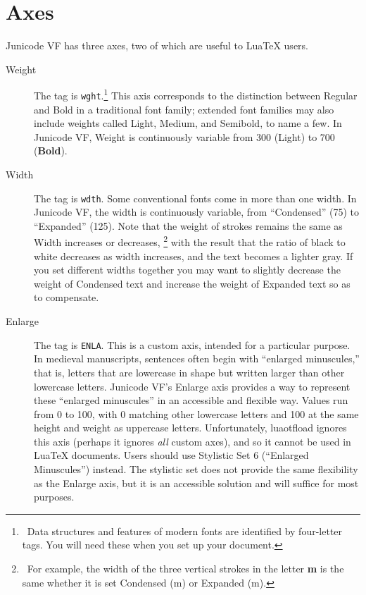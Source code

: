 \documentclass[11pt]{article}
\newcommand{\ltech}{Lua\kern-1.5pt\TeX}
\begin{document}
\section*{Axes}

Junicode VF has three axes, two of which are useful to \ltech{} users.
\begin{description}
\item[Weight] The tag is \texttt{wght}.\footnote{\ Data structures and features
of modern fonts are identified by four-letter tags. You will need these when
you set up your document.} This axis corresponds to the
distinction between Regular and Bold in a traditional font family; extended
font families may also include weights called Light, Medium, and Semibold,
to name a few. In Junicode VF, Weight is continuously variable from 300
({\light Light}) to 700 (\textbf{Bold}).
\item[Width] The tag is \texttt{wdth}. Some conventional fonts come in more
than one width. In Junicode VF, the width is continuously variable, from
{\condensed “Condensed”} (75) to {\expanded “Expanded”} (125). Note that the
weight of strokes remains the same as Width increases or decreases,%
\footnote{\ For example, the width of the three vertical strokes in the letter
\textbf{m} is the same whether it is set Condensed ({\condensedbold m})
or Expanded ({\expandedbold m}).} with the result that the ratio of black to
white decreases as width increases, and the text becomes a lighter gray. If you
set different widths together you may want to slightly decrease the weight of
Condensed text and increase the weight of Expanded text so as to compensate.
\item[Enlarge] The tag is \texttt{ENLA}. This is a custom axis, intended for a
particular purpose. In medieval manuscripts, sentences often begin with
“enlarged minuscules,” that is, letters that are lowercase in shape but
written larger than other lowercase letters. Junicode VF's Enlarge axis
provides a way to represent these “enlarged minuscules” in an accessible and
flexible way. Values run from 0 to 100, with 0 matching other lowercase letters
and 100 at the same height and weight as uppercase letters. Unfortunately,
luaotfload ignores this axis (perhaps it ignores \textit{all} custom axes), and so it
cannot be used in \ltech{} documents. Users should use Stylistic Set 6 (“Enlarged
Minuscules”) instead. The stylistic set does not provide the same flexibility
as the Enlarge axis, but it is an accessible solution and will suffice for most purposes.
\end{description}
\end{document}
